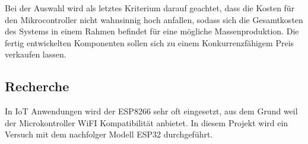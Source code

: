 Bei der Auswahl wird als letztes Kriterium darauf geachtet, dass die Kosten für den Mikrocontroller nicht wahnsinnig hoch anfallen, sodass sich die Gesamtkosten des Systems in einem Rahmen befindet für eine mögliche Massenproduktion. Die fertig entwickelten Komponenten sollen sich zu einem Konkurrenzfähigem Preis verkaufen lassen.

\subsection{Recherche}
In IoT Anwendungen wird der ESP8266 sehr oft eingesetzt, aus dem Grund weil der Microkontroller WiFI Kompatibilität anbietet. In diesem Projekt wird ein Versuch mit dem nachfolger Modell ESP32 durchgeführt.